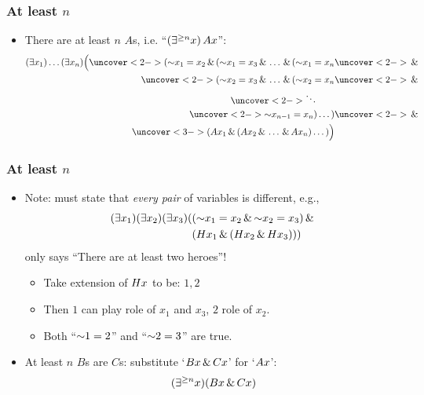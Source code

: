 \begin{frame}
  \frametitle{At least $n$}

\begin{itemize}
\item There are at least $n$ $A$s, i.e. ``$(\exists^{\ge n} x)\,Ax$'':
\begin{align*}
\qt{\exists}{x_1}\dots\qt{\exists}{x_n}\Big(\uncover<2->{(\enot x_1 = x_2 \land (\enot x_1 = x_3 \land \dots \land (\enot x_1 = x_n} & \uncover<2->{{} \land {}}\\
\uncover<2->{(\enot x_2 = x_3 \land \dots \land (\enot x_2 = x_n} & \uncover<2->{{} \land {}}\\
\uncover<2->{\ddots}\qquad &\\
\uncover<2->{\enot x_{n-1} = x_n)\dots)} & \uncover<2->{{} \land {}}\\
\uncover<3->{(A\qv{x_1} \land (A\qv{x_2} \land \dots \land A\qv{x_n})\dots)\Big)}
\end{align*}
\end{itemize}
\end{frame}

\begin{frame}
  \frametitle{At least $n$}

\begin{itemize}[<+->]
\item Note: must state that \emph{every pair} of variables is different, e.g.,
\begin{align*}
\qt{\exists}{x_1}\qt{\exists}{x_2}\qt{\exists}{x_3}(&(\enot x_1 = x_2 \land \enot x_2 = x_3) \land {}\\
& (H\qv{x_1} \land (H\qv{x_2} \land H\qv{x_3})))
\end{align*}
only says ``There are at least two heroes''!
\begin{itemize}[<+->]
  \item Take extension of $Hx$ to be: $1,2$
  \item Then $1$ can play role of $x_1$ and $x_3$, $2$ role of $x_2$.
  \item Both ``$\enot 1=2$'' and ``$\enot 2=3$'' are true.
\end{itemize}
\item At least $n$ $B$s are $C$s: substitute `$Bx \,\&\, Cx$' for `$Ax$':
\[
(\exists^{\ge n} x) (Bx \,\&\, Cx)
\]
\end{itemize}
\end{frame}

